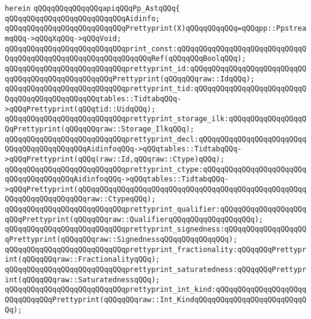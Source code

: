 \verb|herein|\newline
\newline
\verb|qQQqqQQqqQQqqQQqapiqQQqPp_AstqQQq{|\newline
\newline
\verb|qQQqqQQqqQQqqQQqqQQqqQQqqQQqAidinfo;|\newline
\verb|qQQqqQQqqQQqqQQqqQQqqQQqqQQqPrettyprint(X)qQQqqQQqqQQq=qQQqpp::PpstreamqQQq->qQQqXqQQq->qQQqVoid;|\newline
\newline
\verb|qQQqqQQqqQQqqQQqqQQqqQQqqQQqprint_const:qQQqqQQqqQQqqQQqqQQqqQQqqQQqqQQqqQQqqQQqqQQqqQQqqQQqqQQqqQQqqQQqRef(qQQqqQQqBoolqQQq);|\newline
\verb|qQQqqQQqqQQqqQQqqQQqqQQqqQQqprettyprint_id:qQQqqQQqqQQqqQQqqQQqqQQqqQQqqQQqqQQqqQQqqQQqqQQqqQQqPrettyprint(qQQqqQQqraw::IdqQQq);|\newline
\verb|qQQqqQQqqQQqqQQqqQQqqQQqqQQqprettyprint_tid:qQQqqQQqqQQqqQQqqQQqqQQqqQQqqQQqqQQqqQQqqQQqqQQqtables::TidtabqQQq->qQQqPrettyprint(qQQqtid::UidqQQq);|\newline
\verb|qQQqqQQqqQQqqQQqqQQqqQQqqQQqprettyprint_storage_ilk:qQQqqQQqqQQqqQQqqQQqPrettyprint(qQQqqQQqraw::Storage_IlkqQQq);|\newline
\verb|qQQqqQQqqQQqqQQqqQQqqQQqqQQqprettyprint_decl:qQQqqQQqqQQqqQQqqQQqqQQqqQQqqQQqqQQqqQQqqQQqAidinfoqQQq->qQQqtables::TidtabqQQq->qQQqPrettyprint(qQQq(raw::Id,qQQqraw::Ctype)qQQq);|\newline
\verb|qQQqqQQqqQQqqQQqqQQqqQQqqQQqprettyprint_ctype:qQQqqQQqqQQqqQQqqQQqqQQqqQQqqQQqqQQqqQQqAidinfoqQQq->qQQqtables::TidtabqQQq->qQQqPrettyprint(qQQqqQQqqQQqqQQqqQQqqQQqqQQqqQQqqQQqqQQqqQQqqQQqqQQqqQQqqQQqqQQqqQQqqQQqraw::CtypeqQQq);|\newline
\verb|qQQqqQQqqQQqqQQqqQQqqQQqqQQqprettyprint_qualifier:qQQqqQQqqQQqqQQqqQQqqQQqPrettyprint(qQQqqQQqraw::QualifierqQQqqQQqqQQqqQQqqQQq);|\newline
\verb|qQQqqQQqqQQqqQQqqQQqqQQqqQQqprettyprint_signedness:qQQqqQQqqQQqqQQqqQQqPrettyprint(qQQqqQQqraw::SignednessqQQqqQQqqQQqqQQq);|\newline
\verb|qQQqqQQqqQQqqQQqqQQqqQQqqQQqprettyprint_fractionality:qQQqqQQqPrettyprint(qQQqqQQqraw::FractionalityqQQq);|\newline
\verb|qQQqqQQqqQQqqQQqqQQqqQQqqQQqprettyprint_saturatedness:qQQqqQQqPrettyprint(qQQqqQQqraw::SaturatednessqQQq);|\newline
\verb|qQQqqQQqqQQqqQQqqQQqqQQqqQQqprettyprint_int_kind:qQQqqQQqqQQqqQQqqQQqqQQqqQQqqQQqPrettyprint(qQQqqQQqraw::Int_KindqQQqqQQqqQQqqQQqqQQqqQQqqQQq);|\newline
